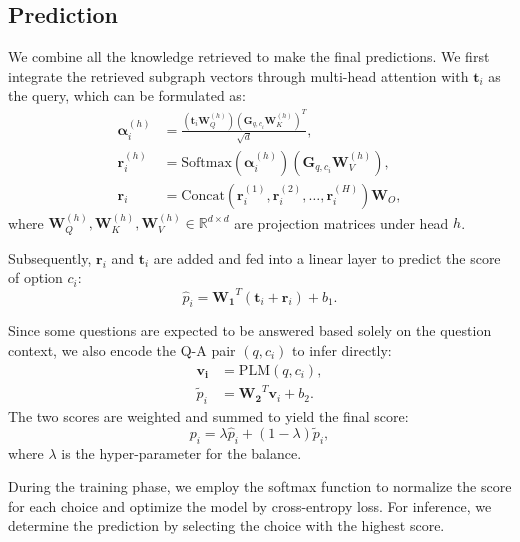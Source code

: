 \documentclass[runningheads]{llncs}
\begin{document}
\subsection{Prediction}
\label{sec:prediction}
We combine all the knowledge retrieved to make the final predictions. We first integrate the retrieved subgraph vectors through multi-head attention with $\boldsymbol{t}_i$ as the query, which can be formulated as:
\begin{equation}
    \begin{aligned}
        \boldsymbol{\alpha}_i^{(h)} &= \frac{(\boldsymbol{t}_i\boldsymbol{W}_Q^{(h)})(\boldsymbol{G}_{q,c_i}\boldsymbol{W}_K^{(h)})^T}{\sqrt d}, \\
        \boldsymbol{r}_i^{(h)} &= \text{Softmax}(\boldsymbol{\alpha}_i^{(h)})(\boldsymbol{G}_{q,c_i}\boldsymbol{W}_V^{(h)}), \\
        \boldsymbol{r}_i &= \text{Concat}(\boldsymbol{r}_i^{(1)},\boldsymbol{r}_i^{(2)},\dots,\boldsymbol{r}_i^{(H)})\boldsymbol{W}_O,
    \end{aligned}
\end{equation}
where $\boldsymbol{W}_Q^{(h)},\boldsymbol{W}_K^{(h)},\boldsymbol{W}_V^{(h)} \in \mathbb{R}^{d \times d}$ are projection matrices under head $h$.

Subsequently, $\boldsymbol{r}_i$ and $\boldsymbol{t}_i$ are added and fed into a linear layer to predict the score of option $c_i$:
\begin{equation}
    \hat{p}_i = \boldsymbol{W_1}^T(\boldsymbol{t}_i + \boldsymbol{r}_i) + b_1.
\end{equation}

Since some questions are expected to be answered based solely on the question context, we also encode the Q-A pair $(q, c_i)$ to infer directly:
\begin{equation}
    \begin{aligned}
    \boldsymbol{v_i} &= \text{PLM}(q, c_i), \\
    \tilde{p}_i &= \boldsymbol{W_2}^T \boldsymbol{v}_i + b_2.
    \end{aligned}
\end{equation}
The two scores are weighted and summed to yield the final score:
\begin{equation}
    p_i = \lambda \hat{p}_i + (1 - \lambda)\tilde{p}_i,
\end{equation}
where $\lambda$ is the hyper-parameter for the balance.

During the training phase, we employ the softmax function to normalize the score for each choice and optimize the model by cross-entropy loss. For inference, we determine the prediction by selecting the choice with the highest score.
\end{document}
